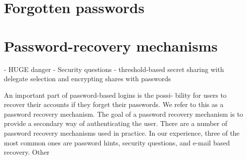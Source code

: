 \section{Forgotten passwords}

\section{Password-recovery mechanisms}
  - HUGE danger
  - Security questions
  - threshold-based secret sharing with delegate selection and encrypting
  shares with passwords



An important part of password-based logins is the possi-
 bility for users to recover their accounts if they forget their
 passwords. We refer to this as a password recovery mechanism.
 The goal of a password recovery mechanism is to provide a
 secondary way of authenticating the user. There are a number
 of password recovery mechanisms used in practice. In our
 experience, three of the most common ones are password
 hints, security questions, and e-mail based recovery. Other

